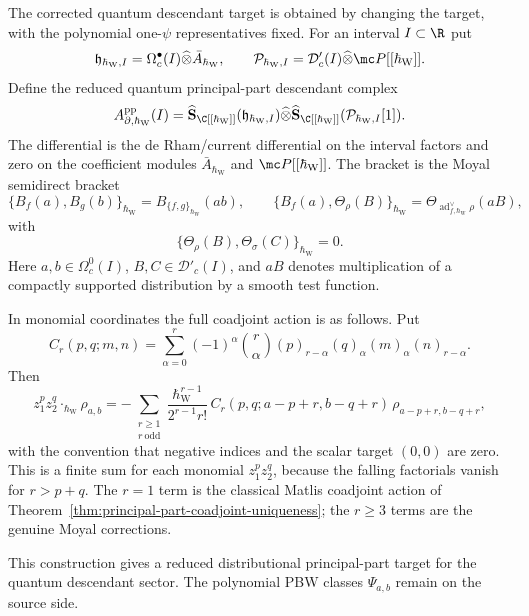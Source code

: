 \begin{constr}
  \label{constr:quantum-principal-part-descendant-target}
  The corrected quantum descendant target is obtained by changing the
  target, with the polynomial one-\(\psi\) representatives fixed.
  For an interval \(I\subset\R\) put
  \[
    \mathfrak h_{\hbar_{\mathrm{W}},I}
      =\Omega^\bullet_c(I)\widehat\otimes\bar A_{\hbar_{\mathrm{W}}},\qquad
    \mathcal P_{\hbar_{\mathrm{W}},I}
      =\mathcal D'_c(I)\widehat\otimes\mc P[[\hbar_{\mathrm{W}}]].
  \]
  Define the reduced quantum principal-part descendant complex
  \[
    A^{\mathrm{pp}}_{\partial,\hbar_{\mathrm{W}}}(I)
    =
    \widehat{\mathbf S}_{\C[[\hbar_{\mathrm{W}}]]}(\mathfrak h_{\hbar_{\mathrm{W}},I})
    \widehat\otimes
    \widehat{\mathbf S}_{\C[[\hbar_{\mathrm{W}}]]}(\mathcal P_{\hbar_{\mathrm{W}},I}[1]).
  \]
  The differential is the de Rham/current differential on the interval
  factors and zero on the coefficient modules \(\bar A_{\hbar_{\mathrm{W}}}\) and
  \(\mc P[[\hbar_{\mathrm{W}}]]\).  The bracket is the Moyal semidirect bracket
  \[
    \{B_f(a),B_g(b)\}_{\hbar_{\mathrm{W}}}
      =B_{\{f,g\}_{\hbar_{\mathrm{W}}}}(ab),\qquad
    \{B_f(a),\Theta_\rho(B)\}_{\hbar_{\mathrm{W}}}
      =\Theta_{\operatorname{ad}^{\vee}_{f,\hbar_{\mathrm{W}}}\rho}(aB),
  \]
  with
  \[
    \{\Theta_\rho(B),\Theta_\sigma(C)\}_{\hbar_{\mathrm{W}}}=0.
  \]
  Here \(a,b\in\Omega^0_c(I)\), \(B,C\in\mathcal D'_c(I)\), and
  \(aB\) denotes multiplication of a compactly supported distribution by
  a smooth test function.

  In monomial coordinates the full coadjoint action is as follows.  Put
  \[
    C_r(p,q;m,n)=
      \sum_{\alpha=0}^{r}(-1)^\alpha\binom r\alpha
      (p)_{r-\alpha}(q)_\alpha(m)_\alpha(n)_{r-\alpha}.
  \]
  Then
  \[
    z_1^pz_2^q\cdot_{\hbar_{\mathrm{W}}}\rho_{a,b}
    =
    -\sum_{\substack{r\geq1\\ r\ \mathrm{odd}}}
      \frac{\hbar_{\mathrm{W}}^{r-1}}{2^{r-1}r!}\,
      C_r(p,q;a-p+r,b-q+r)\,
      \rho_{a-p+r,b-q+r},
  \]
  with the convention that negative indices and the scalar target
  \((0,0)\) are zero.  This is a finite sum for each monomial
  \(z_1^pz_2^q\), because the falling factorials vanish for
  \(r>p+q\).  The \(r=1\) term is the classical Matlis coadjoint action
  of Theorem~\ref{thm:principal-part-coadjoint-uniqueness}; the
  \(r\geq3\) terms are the genuine Moyal corrections.

	  This construction gives a reduced distributional principal-part
	  target for the quantum descendant sector.  The polynomial PBW classes
	  \(\Psi_{a,b}\) remain on the source side.
\end{constr}


